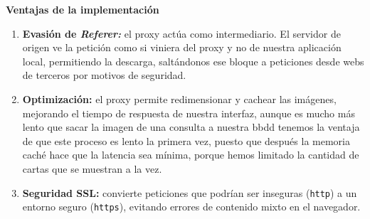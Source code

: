 \documentclass[10pt]{article}
\begin{document}
			\textbf{Ventajas de la implementación}
				\begin{enumerate}
					\item \textbf{Evasión de \textit{Referer:}} el proxy actúa como intermediario. El servidor de origen ve la petición como si viniera del proxy y no de nuestra aplicación local, permitiendo la descarga, saltándonos ese bloque a peticiones desde webs de terceros por motivos de seguridad.
					\item \textbf{Optimización:} el proxy permite redimensionar y cachear las imágenes, mejorando el tiempo de respuesta de nuestra interfaz, aunque es mucho más lento que sacar la imagen de una consulta a nuestra bbdd tenemos la ventaja de que este proceso es lento la primera vez, puesto que después la memoria caché hace que la latencia sea mínima, porque hemos limitado la cantidad de cartas que se muestran a la vez.
					\item \textbf{Seguridad SSL:} convierte peticiones que podrían ser inseguras (\texttt{http}) a un entorno seguro (\texttt{https}), evitando errores de contenido mixto en el navegador.
				\end{enumerate}
			
			\newpage
\end{document}
